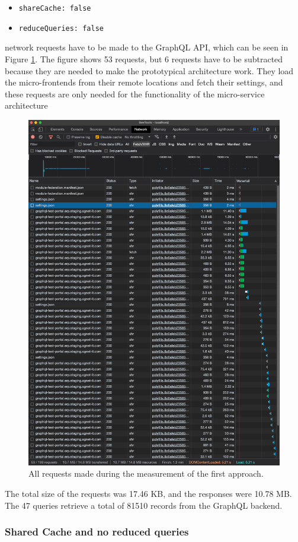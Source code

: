 \begin{itemize}
  \item \texttt{shareCache: false}
  \item \texttt{reduceQueries: false}
\end{itemize}

 network requests have to be made to the GraphQL \ac{API}, which can be seen in Figure \ref{fig:results:no-shared-cache-no-reduction}. The figure shows 53 requests, but 6 requests have to be subtracted because they are needed to make the prototypical architecture work. They load the micro-frontends from their remote locations and fetch their settings, and these requests are only needed for the functionality of the micro-service architecture

\ifshowImages
\begin{figure}[H]
\centering
\includegraphics[width=0.6\linewidth]{images/results/1-attempt/no-shared-cache-no-reduction.png}
\caption{All requests made during the measurement of the first approach.}\label{fig:results:no-shared-cache-no-reduction}
\end{figure}
\fi

\noindent The total size of the requests was 17.46 KB, and the responses were 10.78 MB. The 47 queries retrieve a total of 81510 records from the GraphQL backend.

\subsubsection{Shared Cache and no reduced queries}\label{subsubsection:results:performance-measurement:shared-cache-no-reduction}

